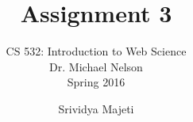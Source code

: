 \documentclass[envcountsame,envcountchap]{svmono}
\begin{document}
\author{Srividya Majeti}
\title{Assignment 3}

\subtitle{CS 532:  Introduction to Web Science\\Dr. Michael Nelson\\Spring 2016}

\maketitle

\frontmatter

\tableofcontents

\mainmatter






\backmatter
 		
\nocite{*}  					
\small  					


\end{document}
